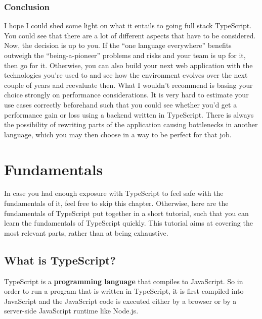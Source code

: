 \documentclass[12pt,a4paper]{report}
\begin{document}
\subsection{Conclusion}
I hope I could shed some light on what it entails to going full stack TypeScript. You could see that there are a lot of different aspects that have to be considered. Now, the decision is up to you. If the ``one language everywhere'' benefits outweigh the ``being-a-pioneer'' problems and risks and your team is up for it, then go for it. Otherwise, you can also build your next web application with the technologies you're used to and see how the environment evolves over the next couple of years and reevaluate then. What I wouldn't recommend is basing your choice strongly on performance considerations. It is very hard to estimate your use cases correctly beforehand such that you could see whether you'd get a performance gain or loss using a backend written in TypeScript. There is always the possibility of rewriting parts of the application causing bottlenecks in another language, which you may then choose in a way to be perfect for that job.

\chapter{Fundamentals}
\label{chapter:fundamentals}

In case you had enough exposure with TypeScript to feel safe with the fundamentals of it, feel free to skip this chapter. Otherwise, here are the fundamentals of TypeScript put together in a short tutorial, such that you can learn the fundamentals of TypeScript quickly. This tutorial aims at covering the most relevant parts, rather than at being exhaustive.

\section{What is TypeScript?}

TypeScript is a \textbf{programming language} that compiles to JavaScript. So in order to run a program that is written in TypeScript, it is first compiled into JavaScript and the JavaScript code is executed either by a browser or by a server-side JavaScript runtime like Node.js.
\end{document}
